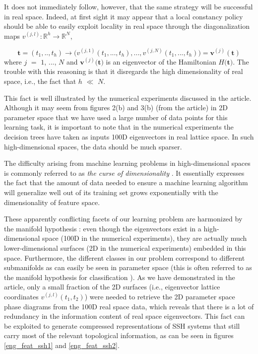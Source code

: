 \documentclass[10pt]{revtex4-1}
\begin{document}
It does not immediately follow, however, that the same strategy will be successful in real space. Indeed, at first sight it may appear that a local constancy policy should be able to easily exploit locality in real space through the diagonalization maps $v^{(j,l)}: \mathbb{R}^h \rightarrow \mathbb{R}^{N}$,

\begin{equation}
\label{parameter_to_real}
\mathbf{t} = (t_1,..,t_h) \rightarrow \Big(v^{(j,1)}(t_1,...,t_h),...,v^{(j,N)}(t_1,...,t_h)\Big) = \mathbf{v}^{(j)}(\mathbf{t}) 
\end{equation}
where $j$ $=$ $1$, ..., $N$ and $\mathbf{v}^{(j)}$$($$\mathbf{t}$$)$ is an eigenvector of the Hamiltonian $H$$($$\mathbf{t}$$)$. The trouble with this reasoning is that it disregards the high dimensionality of real space, i.e., the fact that $h$ $\ll$ $N$.

This fact is well illustrated by the numerical experiments discussed in the article. Although it may seem from figures 2(b) and 3(b) (from the article) in 2D parameter space that we have used a large number of data points for this learning task, it is important to note that in the numerical experiments the decision trees have taken as inputs 100D eigenvectors in real lattice space. In such high-dimensional spaces, the data should be much sparser.

The difficulty arising from machine learning problems in high-dimensional spaces is commonly referred to as \emph{the curse of dimensionality} \cite{bishop2006pattern}. It essentially expresses the fact that the amount of data needed to ensure a machine learning algorithm will generalize well out of its training set grows exponentially with the dimensionality of feature space.

These apparently conflicting facets of our learning problem are harmonized by the manifold hypothesis \cite{cayton2005algorithms,narayanan2010sample}: even though the eigenvectors exist in a high-dimensional space (100D in the numerical experiments), they are actually much lower-dimensional surfaces (2D in the numerical experiments) embedded in this space. Furthermore, the different classes in our problem correspond to different submanifolds as can easily be seen in parameter space (this is often referred to as the manifold hypothesis for classification \cite{rifai2011manifold}). As we have demonstrated in the article, only a small fraction of the 2D surfaces (i.e., eigenvector lattice coordinates $v^{(j,l)}(t_1,t_2)$) were needed to retrieve the 2D parameter space phase diagrams from the 100D real space data, which reveals that there is a lot of redundancy in the information content of real space eigenvectors. This fact can be exploited to generate compressed representations of SSH systems that still carry most of the relevant topological information, as can be seen in figures \ref{eng_feat_ssh1} and \ref{eng_feat_ssh2}.  
\end{document}
